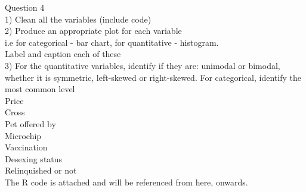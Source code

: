 \documentclass[a4paper]{article}
\begin{document}
	\newpage
	Question 4\\
1) Clean all the variables (include code)\\
2) Produce an appropriate plot for each variable\\
i.e for categorical - bar chart, for quantitative - histogram.\\
Label and caption each of these\\
3) For the quantitative variables, identify if they are: unimodal or bimodal, whether it is symmetric, left-skewed or right-skewed. For categorical, identify the most common level\\
	
Price\\
Cross\\
Pet offered by\\
Microchip\\
Vaccination\\
Desexing status\\
Relinquished or not\\

The R code is attached and will be referenced from here, onwards.\\
\end{document}
